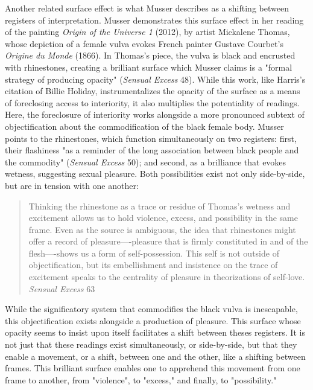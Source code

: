 \documentclass[11pt]{article}
\begin{document}
Another related surface effect is what Musser describes as a shifting
between registers of interpretation. Musser demonstrates this surface
effect in her reading of the painting \emph{Origin of the Universe 1}
(2012), by artist Mickalene Thomas, whose depiction of a female vulva
evokes French painter Gustave Courbet's \emph{Origine du Monde} (1866). In
Thomas's piece, the vulva is black and encrusted with rhinestones,
creating a brilliant surface which Musser claims is a "formal strategy
of producing opacity" (\emph{Sensual Excess} 48). While this work, like
Harris's citation of Billie Holiday, instrumentalizes the opacity of
the surface as a means of foreclosing access to interiority, it also
multiplies the potentiality of readings. Here, the foreclosure of
interiority works alongside a more pronounced subtext of
objectification about the commodification of the black female
body. Musser points to the rhinestones, which function simultaneously
on two registers: first, their flashiness "as a reminder of the long
association between black people and the commodity" (\emph{Sensual Excess}
50); and second, as a brilliance that evokes wetness, suggesting
sexual pleasure. Both possibilities exist not only side-by-side, but
are in tension with one another:
\begin{quote}
Thinking the rhinestone as a trace or residue of Thomas’s wetness and
excitement allows us to hold violence, excess, and possibility in the
same frame. Even as the source is ambiguous, the idea that rhinestones
might offer a record of pleasure—-pleasure that is firmly constituted
in and of the flesh—-shows us a form of self-possession. This self is
not outside of objectification, but its embellishment and insistence
on the trace of excitement speaks to the centrality of pleasure in
theorizations of self-love. \emph{Sensual Excess} 63
\end{quote}
While the significatory system that commodifies the black vulva is
inescapable, this objectification exists alongside a production of
pleasure. This surface whose opacity seems to insist upon itself
facilitates a shift between theses registers. It is not just that
these readings exist simultaneously, or side-by-side, but that they
enable a movement, or a shift, between one and the other, like a
shifting between frames. This brilliant surface enables one to
apprehend this movement from one frame to another, from "violence", to
"excess," and finally, to "possibility."
\end{document}
